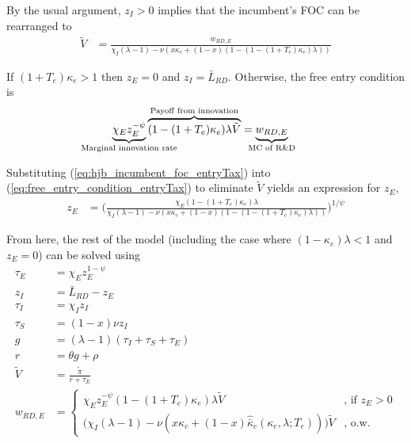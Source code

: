 \documentclass[11pt,english]{article}
\theoremstyle{remark}
\begin{document}
By the usual argument, $z_I > 0$ implies that the incumbent's FOC can be rearranged to
\begin{align}
\tilde{V} &= \frac{w_{RD,E}}{\chi_I(\lambda -1) - \nu (x\kappa_c + (1-x)(1 - (1-(1+T_e)\kappa_e)\lambda)) } \label{eq:hjb_incumbent_foc_entryTax}
\end{align}

If $(1 + T_e) \kappa_e > 1$ then $z_E = 0$ and $z_I = \bar{L}_{RD}$. Otherwise, the free entry condition is
\begin{align}
\underbrace{\chi_E z_E^{-\psi}}_{\mathclap{\text{Marginal innovation rate}}} \overbrace{(1-(1+T_e)\kappa_e) \lambda \tilde{V}}^{\mathclap{\text{Payoff from innovation}}} &= \underbrace{w_{RD,E}}_{\mathclap{\text{MC of R\&D}}} \label{eq:free_entry_condition_entryTax}
\end{align}

Substituting (\ref{eq:hjb_incumbent_foc_entryTax}) into (\ref{eq:free_entry_condition_entryTax}) to eliminate $\tilde{V}$ yields an expression for $z_E$, 
\begin{align}
z_E &= \Bigg( \frac{\chi_E (1-(1+T_e)\kappa_{e}) \lambda}{\chi_I(\lambda -1) - \nu (x\kappa_c + (1-x)(1 - (1-(1+T_e)\kappa_e)\lambda)) } \Bigg)^{1/\psi} \label{eq:effort_entrant_entryTax}
\end{align}

From here, the rest of the model (including the case where $(1-\kappa_e)\lambda < 1$ and $z_E = 0$) can be solved using
\begin{align}
\tau_E &= \chi_E z_E^{1-\psi} \\
z_I &= \bar{L}_{RD} - z_E \label{eq:labor_resource_constraint_entryTax}\\ 
\tau_I &= \chi_I z_I \\
\tau_S &= (1-x) \nu z_I \\
g &= (\lambda - 1) (\tau_I + \tau_S + \tau_E) \\
r &= \theta g + \rho \\
\tilde{V} &= \frac{\tilde{\pi}}{r + \tau_E} \\ 
w_{RD,E} &= \begin{cases}
				\chi_E z_E^{-\psi} (1-(1+T_e)\kappa_e) \lambda \tilde{V} &\textrm{, if } z_E > 0\\
				\Big( \chi_I(\lambda -1) - \nu (x\kappa_c + (1-x)\hat{\bar{\kappa}}_c(\kappa_e,\lambda;T_e))\Big) \tilde{V} &\textrm{, o.w.}
			\end{cases} \label{eq:wage_rd_labor_entryTax}
\end{align}
\end{document}

